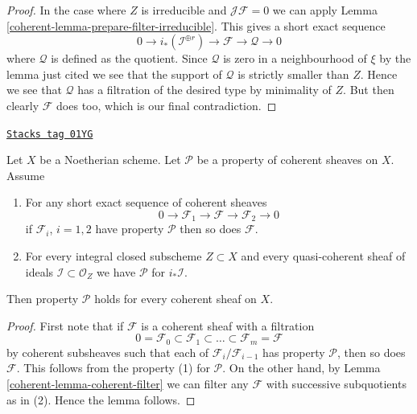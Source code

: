 \begin{proof}
\medskip\noindent
In the case where $Z$ is irreducible and $\mathcal{J}\mathcal{F} = 0$
we can apply Lemma \ref{coherent-lemma-prepare-filter-irreducible}.
This gives a short exact sequence
$$
0 \to
i_*(\mathcal{I}^{\oplus r}) \to
\mathcal{F} \to
\mathcal{Q} \to 0
$$
where $\mathcal{Q}$ is defined as the quotient.
Since $\mathcal{Q}$ is zero in a neighbourhood of $\xi$ by
the lemma just cited we see that the support of $\mathcal{Q}$
is strictly smaller than $Z$. Hence we see that $\mathcal{Q}$
has a filtration of the desired type by minimality of $Z$.
But then clearly $\mathcal{F}$ does too, which is our final contradiction.
\end{proof}

\begin{lemma}
\label{coherent-lemma-property-initial}
\href{https://stacks.math.columbia.edu/tag/01YG}{\texttt{Stacks tag 01YG}}

Let $X$ be a Noetherian scheme.
Let $\mathcal{P}$ be a property of coherent sheaves on $X$. Assume
\begin{enumerate}
\item For any short exact sequence of coherent sheaves
$$
0 \to \mathcal{F}_1 \to \mathcal{F} \to \mathcal{F}_2 \to 0
$$
if $\mathcal{F}_i$, $i = 1, 2$ have property $\mathcal{P}$
then so does $\mathcal{F}$.
\item For every integral closed subscheme $Z \subset X$
and every quasi-coherent sheaf of ideals
$\mathcal{I} \subset \mathcal{O}_Z$ we have
$\mathcal{P}$ for $i_*\mathcal{I}$.
\end{enumerate}
Then property $\mathcal{P}$ holds for every coherent sheaf
on $X$.
\end{lemma}

\begin{proof}

First note that if $\mathcal{F}$ is a coherent sheaf with a filtration
$$
0 = \mathcal{F}_0 \subset \mathcal{F}_1 \subset
\ldots \subset \mathcal{F}_m = \mathcal{F}
$$
by coherent subsheaves such that each of $\mathcal{F}_i/\mathcal{F}_{i - 1}$
has property $\mathcal{P}$, then so does $\mathcal{F}$.
This follows from the property (1) for $\mathcal{P}$.
On the other hand, by Lemma \ref{coherent-lemma-coherent-filter}
we can filter any $\mathcal{F}$
with successive subquotients as in (2).
Hence the lemma follows.
\end{proof}

